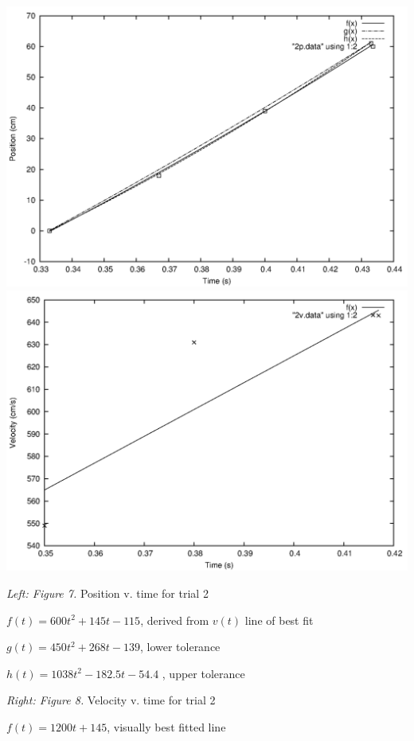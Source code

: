 \documentclass[12pt,letterpaper]{article}
\begin{document}
\newline
\includegraphics[scale=0.6]{2p.png}
\includegraphics[scale=0.6]{2v.png}

\textit{Left: Figure 7.} Position v. time for trial 2

\(f(t) = 600t^2 + 145t - 115\), derived from \(v(t)\) line of best fit

\(g(t) = 450t^2 + 268t -139\), lower tolerance

\(h(t) = 1038t^2 - 182.5t -54.4\) , upper tolerance

\textit{Right: Figure 8.} Velocity v. time for trial 2

\(f(t) = 1200t + 145\), visually best fitted line
\newline\newline
\end{document}

